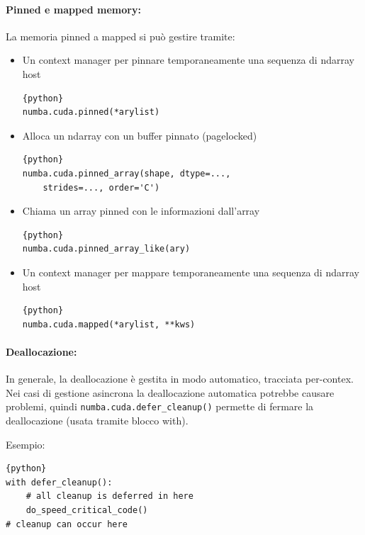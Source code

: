 \paragraph{Pinned e mapped memory:} La memoria pinned a mapped si può gestire tramite:
\begin{itemize}
	\item Un context manager per pinnare temporaneamente una sequenza di ndarray host
	\begin{lstlisting}{python}
numba.cuda.pinned(*arylist)
	\end{lstlisting}
	
	\item Alloca un ndarray con un buffer pinnato (pagelocked)
	\begin{lstlisting}{python}
numba.cuda.pinned_array(shape, dtype=..., 
    strides=..., order='C')
	\end{lstlisting}
	
	\item Chiama un array pinned con le informazioni dall'array 
	\begin{lstlisting}{python}
numba.cuda.pinned_array_like(ary)
	\end{lstlisting}
	
	\item Un context manager  per mappare temporaneamente una sequenza di ndarray host
	\begin{lstlisting}{python}
numba.cuda.mapped(*arylist, **kws)
	\end{lstlisting}
\end{itemize}

\paragraph{Deallocazione:} In generale, la deallocazione è gestita in modo automatico, tracciata per-contex. Nei casi di gestione asincrona la deallocazione automatica potrebbe causare problemi, quindi \texttt{numba.cuda.defer\_cleanup()} permette di fermare la deallocazione (usata tramite blocco with). 

Esempio:
\begin{lstlisting}{python}
with defer_cleanup():
    # all cleanup is deferred in here
    do_speed_critical_code()
# cleanup can occur here
\end{lstlisting}


